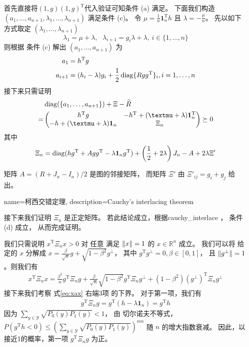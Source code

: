 首先直接将$(1,g)(1,g)^{\mathrm{T}}$代入验证可知条件 (a) 满足。
下面我们构造  $(a_1,\ldots,a_{n+1},\lambda_1,\ldots,\lambda_{n+1})$  满足条件 (c)。
令 $\mu=\frac{1}{n}\mathbf{1}_n^{\mathrm{T}} h$ 且
$\lambda = -\frac{\mu}{n}$。 先以如下方式取定 $(\lambda_1,\ldots,\lambda_{n+1})$
$$
\lambda_1=\mu+\lambda, \text{  }\lambda_{i+1}=g_i\lambda + \lambda,~i\in\{1,\ldots,n\}
$$
则根据 条件 (c) 解出 $(a_1, \dots, a_{n+1})$ 为
\begin{align}
    a_1 &= h^{\mathrm{T}} g \nonumber\\
    a_{i+1} & = (h_i -\lambda)g_i  + \frac{1}{2}\operatorname{diag}\{Rgg^{\mathrm{T}}\}_i, i = 1, \dots, n
\end{align}
接下来只需证明
\begin{align}
    &\diag(\{a_1, \dots, a_{n+1}\}) + \Xi - \widetilde{R} \nonumber\\
    =& \begin{pmatrix} h^{\mathrm{T}} g & -h^{\mathrm{T}} +(\mu + \lambda)\mathbf{1}_n^{\mathrm{T}} \\
        -h+(\mu + \lambda )\mathbf{1}_n & \Xi_n \end{pmatrix}
    \succeq 0
\end{align}
其中
\begin{align}\label{eq:Xi_n}
    \Xi_n =\operatorname{diag}(hg^{\mathrm{T}} + Agg^{\mathrm{T}} -\lambda \mathbf{1}_ng^{\mathrm{T}})
    + \left(\frac{1}{2} +2\lambda \right)
    J_n  - A + 2\lambda \Xi'
\end{align}

矩阵 $A=(R+J_n-I_n)/2$ 是图的邻接矩阵，
而矩阵 $\Xi'$ 由 $\Xi'_{ij}=g_i + g_j$ 给出。

{name=柯西交错定理,
description={Cauchy's interlacing theorem}}

接下来我们证明 $\Xi_n$ 是正定矩阵。
若此结论成立，根据\gls{cauchy_interlace} \cite{hwang}，
条件 (d) 成立，
从而完成证明。

我们只需说明 $x^{\mathrm{T}} \Xi_n x>0$ 对 任意 满足 $\lVert x\rVert=1$ 的 $x \in \mathbb{R}^n$ 成立。
我们可以将 给定的 $x$ 分解成 $x=\frac{\beta}{\sqrt{n}} g
+ \sqrt{1-\beta^2} g^{\perp}$， 其中 $g^{\mathrm{T}}g^{\perp}=0, \beta \in [0,1]$，
且 $\lVert g^{\perp}\rVert=1$。则我们有 
\begin{align}\label{eq:xax}
    x^{\mathrm{T}} \Xi_n x = \frac{\beta^2}{n} g^{\mathrm{T}} \Xi_n g  
    +		\frac{\beta}{\sqrt{n}}\sqrt{1-\beta^2} g^{\mathrm{T}} \Xi_n g^{\perp}
    +
    (1-\beta^2)(g^{\perp})^{\mathrm{T}} \Xi_n g^{\perp}
\end{align}
接下来我们考察 式\eqref{eq:xax} 右端3项
的下界。
对于第一项，我们有
\begin{align*}
    g^{\mathrm{T}} \Xi_n g = g^{\mathrm{T}}(h -\lambda \mathbf{1}_n)   = g^{\mathrm{T}} h
\end{align*}
因为 $\sum_{y \in \mathcal{Y}} \sqrt{P_0(y)P_1(y)} < 1$，
由 切尔诺夫不等式， 
$P(g^{\mathrm{T}} h < 0) \leq (\sum_{y \in \mathcal{Y}} \sqrt{P_0(y)P_1(y)})^{mn}$
随 $n$ 的增大指数衰减。
因此，以接近1的概率，第一项 $g^{\mathrm{T}} \Xi_n g$ 为正。

